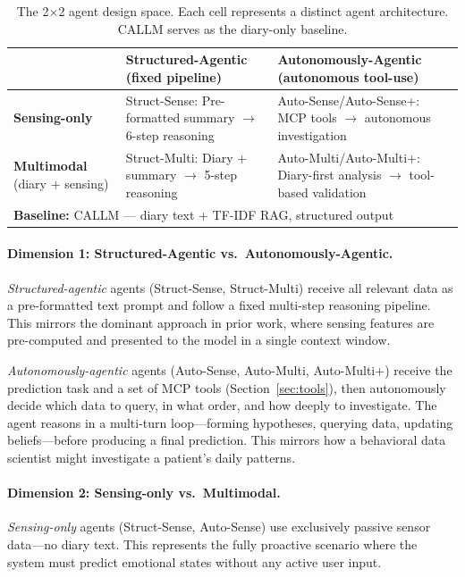 \documentclass[screen,review,anonymous]{acmart}
\begin{document}
\begin{table}[t]
\caption{The 2$\times$2 agent design space. Each cell represents a distinct agent architecture. CALLM serves as the diary-only baseline.}
\label{tab:design}
\small
\begin{tabular}{p{2cm}p{3.5cm}p{3.5cm}}
\toprule
& \textbf{Structured-Agentic} (fixed pipeline) & \textbf{Autonomously-Agentic} (autonomous tool-use) \\
\midrule
\textbf{Sensing-only} & Struct-Sense: Pre-formatted summary $\rightarrow$ 6-step reasoning & Auto-Sense/Auto-Sense+: MCP tools $\rightarrow$ autonomous investigation \\
\addlinespace
\textbf{Multimodal} (diary + sensing) & Struct-Multi: Diary + summary $\rightarrow$ 5-step reasoning & Auto-Multi/Auto-Multi+: Diary-first analysis $\rightarrow$ tool-based validation \\
\midrule
\multicolumn{3}{l}{\textbf{Baseline:} CALLM --- diary text + TF-IDF RAG, structured output~\cite{wang2026callm}} \\
\bottomrule
\end{tabular}
\end{table}

\paragraph{Dimension 1: Structured-Agentic vs.\ Autonomously-Agentic.}
\emph{Structured-agentic} agents (Struct-Sense, Struct-Multi) receive all relevant data as a pre-formatted text prompt and follow a fixed multi-step reasoning pipeline. This mirrors the dominant approach in prior work, where sensing features are pre-computed and presented to the model in a single context window.

\emph{Autonomously-agentic} agents (Auto-Sense, Auto-Multi, Auto-Multi+) receive the prediction task and a set of MCP tools (Section~\ref{sec:tools}), then autonomously decide which data to query, in what order, and how deeply to investigate. The agent reasons in a multi-turn loop---forming hypotheses, querying data, updating beliefs---before producing a final prediction. This mirrors how a behavioral data scientist might investigate a patient's daily patterns.

\paragraph{Dimension 2: Sensing-only vs.\ Multimodal.}
\emph{Sensing-only} agents (Struct-Sense, Auto-Sense) use exclusively passive sensor data---no diary text. This represents the fully proactive scenario where the system must predict emotional states without any active user input.
\end{document}
